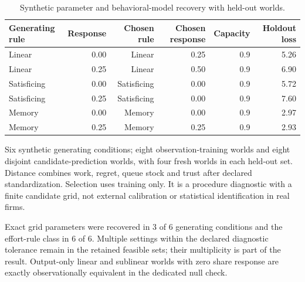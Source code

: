 \begin{table}[tbp]
\centering\small
\caption{Synthetic parameter and behavioral-model recovery with held-out worlds.}
\label{tab:synthetic-recovery}
\begin{tabular}{lrrrrr}
\toprule
Generating rule & Response & Chosen rule & Chosen response & Capacity & Holdout loss \\
\midrule
Linear & 0.00 & Linear & 0.25 & 0.9 & 5.26 \\
Linear & 0.25 & Linear & 0.50 & 0.9 & 6.90 \\
Satisficing & 0.00 & Satisficing & 0.00 & 0.9 & 5.72 \\
Satisficing & 0.25 & Satisficing & 0.00 & 0.9 & 7.60 \\
Memory & 0.00 & Memory & 0.00 & 0.9 & 2.97 \\
Memory & 0.25 & Memory & 0.25 & 0.9 & 2.93 \\
\bottomrule
\end{tabular}
\par\smallskip\begin{minipage}{0.96\textwidth}\footnotesize Six synthetic generating conditions; eight observation-training worlds and eight disjoint candidate-prediction worlds, with four fresh worlds in each held-out set. Distance combines work, regret, queue stock and trust after declared standardization. Selection uses training only. It is a procedure diagnostic with a finite candidate grid, not external calibration or statistical identification in real firms.\end{minipage}
\end{table}
Exact grid parameters were recovered in 3 of 6 generating conditions and the effort-rule class in 6 of 6. Multiple settings within the declared diagnostic tolerance remain in the retained feasible sets; their multiplicity is part of the result. Output-only linear and sublinear worlds with zero share response are exactly observationally equivalent in the dedicated null check.
